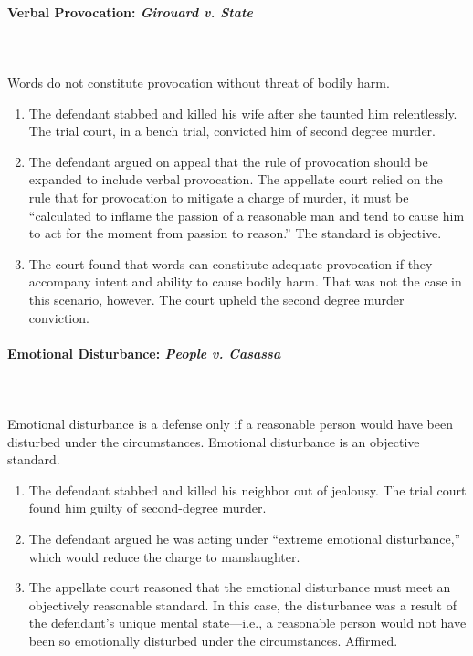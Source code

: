 \paragraph{Verbal Provocation: \emph{Girouard v. State}}
~\\\\
Words do not constitute provocation without threat of bodily harm.

\begin{enumerate}
    \item The defendant stabbed and killed his wife after she taunted him 
    relentlessly. The trial court, in a bench trial, convicted him of second 
    degree murder.
    \item The defendant argued on appeal that the rule of provocation should 
    be expanded to include verbal provocation. The appellate court relied on 
    the rule that for provocation to mitigate a charge of murder, it must be 
    ``calculated to inflame the passion of a reasonable man and tend to cause 
    him to act for the moment from passion to reason.'' The standard is 
    objective.
    \item The court found that words can constitute adequate provocation if 
    they accompany intent and ability to cause bodily harm. That was not the 
    case in this scenario, however. The court upheld the second degree murder 
    conviction.
\end{enumerate}

\paragraph{Emotional Disturbance: \emph{People v. Casassa}}
~\\\\
Emotional disturbance is a defense only if a reasonable person would have been 
disturbed under the circumstances. Emotional disturbance is an objective 
standard.

\begin{enumerate}
    \item The defendant stabbed and killed his neighbor out of jealousy. The 
    trial court found him guilty of second-degree murder.
    \item The defendant argued he was acting under ``extreme emotional 
    disturbance,'' which would reduce the charge to manslaughter.
    \item The appellate court reasoned that the emotional disturbance must 
    meet an objectively reasonable standard. In this case, the disturbance was 
    a result of the defendant's unique mental state---i.e., a reasonable 
    person would not have been so emotionally disturbed under the 
    circumstances. Affirmed.
\end{enumerate}

